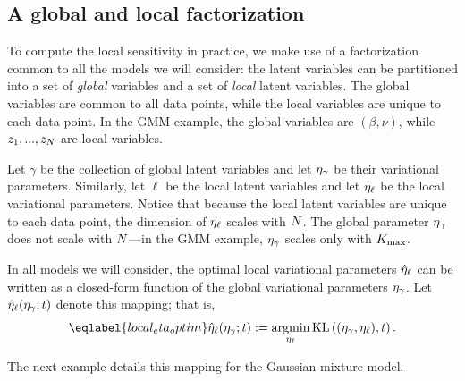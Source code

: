 \subsection{A global and local factorization}

To compute the local sensitivity in practice, we
make use of a factorization common to all the models we will consider:
the latent variables can be partitioned into a set of \textit{global}
variables and a set of \textit{local} latent variables.
The global variables are common to all data points, while the local variables
are unique to each data point.
In the GMM example, the global variables are $(\beta, \nu)$,
while $z_1, ..., z_N$ are local variables.

Let $\gamma$ be the collection of global latent variables
and let $\eta_{\gamma}$ be their variational parameters.
Similarly, let $\ell$ be the local latent variables and
let $\eta_{\ell}$ be the local variational parameters.
Notice that because the local latent variables are unique to each data point,
the dimension of $\eta_{\ell}$ scales with $N$.
The global parameter $\eta_{\gamma}$ does not scale with $N$---in the GMM example,
$\eta_{\gamma}$ scales only with ${K_{\mathrm{max}}}$.

In all models we will consider,
the optimal local variational parameters $\hat\eta_{\ell}$ can be written
as a closed-form function of the global variational parameters $\eta_{\gamma}$.
Let $\hat\eta_{\ell}(\eta_\gamma; t)$ denote this mapping; that is,
\begin{align}\eqlabel{local_eta_optim}
  \etaoptlocal(\etaglob; \t) := \argmin_{\etalocal} \KL{(\eta_\gamma, \etalocal), \t}.
\end{align}

The next example details this mapping for the Gaussian mixture model.

